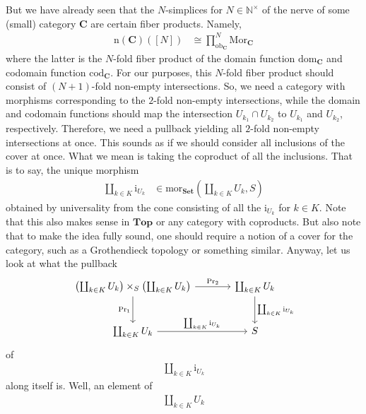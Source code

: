 But we have already seen that the $N$-simplices for $N \in \mathbb{N}^{\times}$ of the nerve of some (small) category $\mathbf{C}$ are certain fiber products.
Namely,
\begin{align*}
  \mathrm{n}
  \left(
    \mathbf{C}
  \right)
  ([N])
  &\cong
  \prod_{\mathrm{ob}_{\mathbf{C}}}^{N}
  \mathrm{Mor}_{\mathbf{C}}
\end{align*}
where the latter is the $N$-fold fiber product of the domain function $\mathrm{dom}_{\mathbf{C}}$ and codomain function $\mathrm{cod}_{\mathbf{C}}$.
For our purposes, this $N$-fold fiber product should consist of $(N+1)$-fold non-empty intersections.
So, we need a category with morphisms corresponding to the $2$-fold non-empty intersections, while the domain and codomain functions should map the intersection $U_{k_{1}} \cap U_{k_{2}}$ to $U_{k_{1}}$ and $U_{k_{2}}$, respectively.
Therefore, we need a pullback yielding all $2$-fold non-empty intersections at once.
This sounds as if we should consider all inclusions of the cover at once.
What we mean is taking the {\glqq}coproduct{\grqq} of all the inclusions.
That is to say, the unique morphism
\begin{align*}
  \coprod_{k \in K}
  \mathrm{i}_{U_{k}}
  &\in
  \mathrm{mor}_{\mathbf{Set}}
  \left(
    \coprod_{k \in K}
    U_{k},
    S
  \right)
\end{align*}
obtained by universality from the cone consisting of all the $\mathrm{i}_{U_{k}}$ for $k \in K$.
Note that this also makes sense in $\mathbf{Top}$ or any category with coproducts.
But also note that to make the idea fully sound, one should require a notion of a cover for the category, such as a Grothendieck topology or something similar.
Anyway, let us look at what the pullback
\[
\begin{tikzcd}[sep=large]
  \left(
    \coprod_{k \in K}
    U_{k}
  \right)
  \times_{S}
  \left(
    \coprod_{k \in K}
    U_{k}
  \right)
  \arrow{r}{\mathrm{Pr_{2}}}
  \arrow[swap]{d}{\mathrm{Pr_{1}}}
  &
  \coprod_{k \in K}
  U_{k}
  \arrow{d}{\coprod_{k \in K}\mathrm{i}_{U_{k}}}
  \\
  \coprod_{k \in K}
  U_{k}
  \arrow{r}{\coprod_{k \in K}\mathrm{i}_{U_{k}}}
  &
  S
\end{tikzcd}
\]
of
\begin{align*}
  \coprod_{k \in K}
  \mathrm{i}_{U_{k}}
\end{align*}
along itself is.
Well, an element of
\begin{align*}
  \coprod_{k \in K}
  U_{k}
\end{align*}
